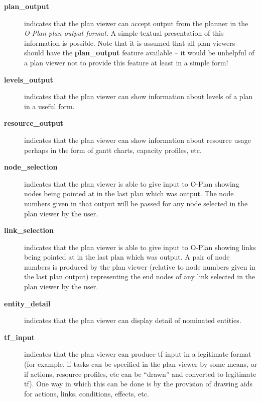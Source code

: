 \begin{description}

\item[{\bf plan\_output}] indicates that the plan viewer can accept
output from the planner in the {\em O-Plan plan output format}.  A
simple textual presentation of this information is possible.  Note that
it is assumed that all plan viewers should have the {\bf plan\_output}
feature available -- it would be unhelpful of a plan viewer not to
provide this feature at least in a simple form!


\item [{\bf levels\_output}]
indicates that the plan viewer can show information about levels of a plan in
a useful form.

\item[{\bf resource\_output}]
indicates that the plan viewer can show information about resource usage
perhaps in the form of gantt charts, capacity profiles, etc.

\item[{\bf node\_selection}]
indicates that the plan viewer is able to give input to O-Plan showing nodes
being pointed at in the last plan which was output.  The node numbers given in
that output will be passed for any node selected in the plan viewer by the
user.

\item[{\bf link\_selection}]
indicates that the plan viewer is able to give input to O-Plan showing
links being pointed at in the last plan which was output.  A pair of
node numbers is produced by the plan viewer (relative to node numbers
given in the last plan output) representing the end nodes of any link
selected in the plan viewer by the user. 

\item[{\bf entity\_detail}]
indicates that the plan viewer can display detail of nominated entities.

\item[{\bf tf\_input}]
indicates that the plan viewer can produce {\sc tf} input in a legitimate
format (for example, if tasks can be specified in the plan viewer by some
means, or if actions, resource profiles, etc can be ``drawn'' and converted to
legitimate {\sc tf}).  One way in which this can be done is by the provision of
drawing aids for actions, links, conditions, effects, etc.

\end{description}


